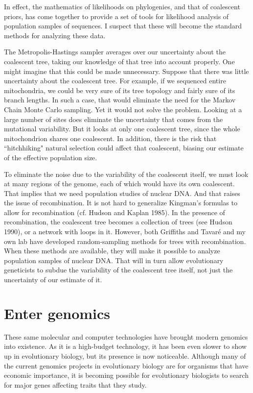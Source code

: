 \documentclass[12pt]{article}
\begin{document}
In effect, the mathematics of likelihoods on phylogenies, and that of
coalescent priors, has come together to provide a set of tools for
likelihood analysis of population samples of sequences.  I suspect that
these will become the standard methods for analyzing these data.

The Metropolis-Hastings sampler averages over our uncertainty about the
coalescent tree, taking our knowledge of that tree into account properly.
One might imagine that this could be made unnecessary.  Suppose that there
was little uncertainty about the coalescent tree.  For example, if we
sequenced entire mitochondria, we could be very sure of its tree topology
and fairly sure of its branch lengths.  In such a case, that
would eliminate the need for the Markov Chain Monte Carlo sampling.
Yet it would not solve the problem.  Looking at a large number of sites
does eliminate the uncertainty that comes from the mutational variability.
But it looks at only one coalescent tree, since the whole mitochondrion
shares one coalescent.  In addition, there is the risk that ``hitchhiking"
natural selection could affect that coalescent, biasing our estimate of
the effective population size.

To eliminate the noise due to the variability of the coalescent itself, we
must look at
many regions of the genome, each of which would have its own coalescent.
That implies that we need population studies of nuclear DNA.  And that
raises the issue of recombination.   It is not hard to generalize
Kingman's formulas to allow for recombination (cf. Hudson and Kaplan 1985).
In the presence of recombination, the coalescent tree becomes a collection
of trees (see Hudson 1990), or a network with loops in it.
However, both Griffiths and Tavar\'e and my own lab have developed
random-sampling methods for trees with recombination.  When these methods
are available, they will make it possible to analyze population samples
of nuclear DNA.   That will in turn allow evolutionary geneticists to
subdue the variability of the coalescent tree itself, not just the
uncertainty of our estimate of it.

\section*{Enter genomics}

These same molecular and computer technologies have brought modern genomics
into existence.  As it is a high-budget technology, it has been even slower to
show up in evolutionary biology, but its presence is now noticeable.  Although
many of the current genomics projects in evolutionary biology are for organisms
that have economic importance, it is becoming possible for evolutionary
biologists to search for major genes affecting traits that they study.
\end{document}
